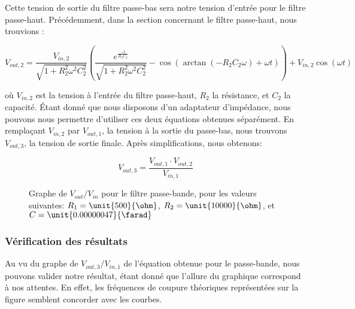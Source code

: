 Cette tension de sortie du filtre passe-bas sera notre tension d'entrée pour le 
filtre passe-haut. Précédemment, dans la section concernant le filtre passe-haut,
nous trouvions :

$$V_{out,2} = \frac{V_{in,2}}{\sqrt{1 + R_{2}^2\omega^2C_{2}^2}}
\left(\frac{e^{\frac{-t}{R_{2}C_{2}}}}{\sqrt{1 + R_{2}^2\omega^2C_{2}^2}} - 
\cos(\arctan(-R_{2}C_{2}\omega) + \omega t)\right) + V_{in,2}\cos(\omega t)$$

où $V_{in,2}$ est la tension à l'entrée du filtre passe-haut, $R_{2}$ la résistance, 
et $C_{2}$ la capacité. Étant donné que nous disposons d'un adaptateur d'impédance, 
nous pouvons nous permettre d'utiliser ces deux équations obtenues séparément.
En remplaçant $V_{in,2}$ par $V_{out,1}$, la tension à la sortie du passe-bas, nous 
trouvons $V_{out,3}$, la tension de sortie finale.
Après simplifications, nous obtenons:

$$V_{out,3} = \frac{V_{out,1} \cdot V_{out,2}}{V_{in,1}}$$

\begin{figure}[ht!]
\centering
{}
\caption{Graphe de $V_{out} / V_{in}$ pour le filtre passe-bande, pour les valeurs suivantes: $R_{1} = \unit{500}{\ohm}$, $R_{2} = \unit{10000}{\ohm}$, et $C = {\unit{0.00000047}{\farad}}$}
\label{lwp_ratio}
\end{figure}
\subsubsection{Vérification des résultats}

Au vu du graphe de $V_{out,3} / V_{in,1}$ de l'équation obtenue pour le passe-bande, nous pouvons
valider notre résultat, étant donné que l'allure du graphique correspond à nos attentes. En effet,
les fréquences de coupure théoriques représentées sur la figure semblent concorder avec les courbes.


